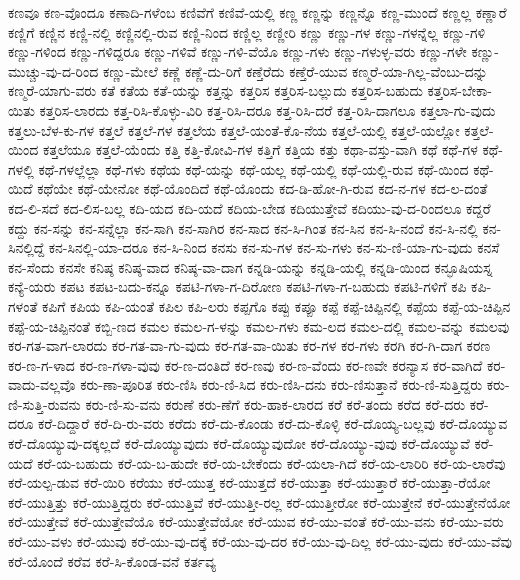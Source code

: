 {ಕಣವೂ
ಕಣ-ವೊಂದೂ
ಕಣಾದಿ-ಗಳೆಂಬ
ಕಣಿವೆಗೆ
ಕಣಿವೆ-ಯಲ್ಲಿ
ಕಣ್ಣ
ಕಣ್ಣನ್ನು
ಕಣ್ಣನ್ನೊ
ಕಣ್ಣ-ಮುಂದೆ
ಕಣ್ಣಲ್ಲ
ಕಣ್ಣಾರೆ
ಕಣ್ಣಿಗೆ
ಕಣ್ಣಿನ
ಕಣ್ಣಿ-ನಲ್ಲಿ
ಕಣ್ಣಿನಲ್ಲಿ-ರುವ
ಕಣ್ಣಿ-ನಿಂದ
ಕಣ್ಣಿಲ್ಲ
ಕಣ್ಣೀರಿ
ಕಣ್ಣು
ಕಣ್ಣು-ಗಳ
ಕಣ್ಣು-ಗಳನ್ನೆಲ್ಲ
ಕಣ್ಣು-ಗಳಿ
ಕಣ್ಣು-ಗಳಿಂದ
ಕಣ್ಣು-ಗಳಿದ್ದರೂ
ಕಣ್ಣು-ಗಳಿವೆ
ಕಣ್ಣು-ಗಳಿ-ವೆಯೊ
ಕಣ್ಣು-ಗಳು
ಕಣ್ಣು-ಗಳುಳ್ಳ-ವರು
ಕಣ್ಣು-ಗಳೇ
ಕಣ್ಣು-ಮುಚ್ಚು-ವು-ದ-ರಿಂದ
ಕಣ್ಣು-ಮೇಲೆ
ಕಣ್ಣೆ
ಕಣ್ಣೆ-ದು-ರಿಗೆ
ಕಣ್ತೆರೆದು
ಕಣ್ತೆರೆ-ಯುವ
ಕಣ್ಮರೆ-ಯಾ-ಗಿಲ್ಲ-ವೆಂಬು-ದನ್ನು
ಕಣ್ಮರೆ-ಯಾಗು-ವರು
ಕತೆ
ಕತೆಯ
ಕತೆ-ಯನ್ನು
ಕತ್ತನ್ನು
ಕತ್ತರಿಸ
ಕತ್ತರಿಸ-ಬಲ್ಲುದು
ಕತ್ತರಿಸ-ಬಹುದು
ಕತ್ತರಿಸ-ಬೇಕಾ-ಯಿತು
ಕತ್ತರಿಸ-ಲಾರದು
ಕತ್ತ-ರಿಸಿ-ಕೊಳ್ಳು-ವಿರಿ
ಕತ್ತ-ರಿಸಿ-ದರೂ
ಕತ್ತ-ರಿಸಿ-ದರೆ
ಕತ್ತ-ರಿಸಿ-ದಾಗಲೂ
ಕತ್ತಲಾ-ಗು-ವುದು
ಕತ್ತಲು-ಬೆಳ-ಕು-ಗಳ
ಕತ್ತಲೆ
ಕತ್ತಲೆ-ಗಳ
ಕತ್ತಲೆಯ
ಕತ್ತಲೆ-ಯಂತೆ-ಕೊ-ನೆಯ
ಕತ್ತಲೆ-ಯಲ್ಲಿ
ಕತ್ತಲೆ-ಯಲ್ಲೋ
ಕತ್ತಲೆ-ಯಿಂದ
ಕತ್ತಲೆಯೂ
ಕತ್ತಲೆ-ಯೆಂದು
ಕತ್ತಿ
ಕತ್ತಿ-ಕೋವಿ-ಗಳ
ಕತ್ತಿಗೆ
ಕತ್ತಿಯ
ಕತ್ತು
ಕಥಾ-ವಸ್ತು-ವಾಗಿ
ಕಥೆ
ಕಥೆ-ಗಳ
ಕಥೆ-ಗಳಲ್ಲಿ
ಕಥೆ-ಗಳಲ್ಲೆಲ್ಲಾ
ಕಥೆ-ಗಳು
ಕಥೆಯ
ಕಥೆ-ಯನ್ನು
ಕಥೆ-ಯಲ್ಲ
ಕಥೆ-ಯಲ್ಲಿ
ಕಥೆ-ಯಲ್ಲಿ-ರುವ
ಕಥೆ-ಯಿಂದ
ಕಥೆ-ಯಿದೆ
ಕಥೆಯೇ
ಕಥೆ-ಯೇನೋ
ಕಥೆ-ಯೊಂದಿದೆ
ಕಥೆ-ಯೊಂದು
ಕದ-ಡಿ-ಹೋ-ಗಿ-ರುವ
ಕದ-ನ-ಗಳ
ಕದ-ಲ-ದಂತೆ
ಕದ-ಲಿ-ಸದೆ
ಕದ-ಲಿಸ-ಬಲ್ಲ
ಕದಿ-ಯದ
ಕದಿ-ಯದೆ
ಕದಿಯ-ಬೇಡ
ಕದಿಯುತ್ತೇವೆ
ಕದಿಯು-ವು-ದ-ರಿಂದಲೂ
ಕದ್ದರೆ
ಕದ್ದು
ಕನ-ಸನ್ನು
ಕನ-ಸನ್ನೆಲ್ಲಾ
ಕನ-ಸಾಗಿ
ಕನ-ಸಾಗಿರ
ಕನ-ಸಾದ
ಕನ-ಸಿ-ಗಿಂತ
ಕನ-ಸಿನ
ಕನ-ಸಿ-ನಂದೆ
ಕನ-ಸಿ-ನಲ್ಲಿ
ಕನ-ಸಿನಲ್ಲಿದ್ದೆ
ಕನ-ಸಿನಲ್ಲಿ-ಯಾ-ದರೂ
ಕನ-ಸಿ-ನಿಂದ
ಕನಸು
ಕನ-ಸು-ಗಳ
ಕನ-ಸು-ಗಳು
ಕನ-ಸು-ಣಿ-ಯಾ-ಗು-ವುದು
ಕನಸೆ
ಕನ-ಸೆಂದು
ಕನಸೇ
ಕನಿಷ್ಠ
ಕನಿಷ್ಠ-ವಾದ
ಕನಿಷ್ಠ-ವಾ-ದಾಗ
ಕನ್ನಡಿ-ಯನ್ನು
ಕನ್ನಡಿ-ಯಲ್ಲಿ
ಕನ್ನಡಿ-ಯಿಂದ
ಕನ್ಫೂಷಿಯಸ್ನ
ಕನ್ಯೆ-ಯರು
ಕಪಟ
ಕಪಟ-ಬದು-ಕನ್ನೂ
ಕಪಟಿ-ಗಳಾ-ಗ-ದಿರೋಣ
ಕಪಟಿ-ಗಳಾ-ಗ-ಬಹುದು
ಕಪಟಿ-ಗಳಿಗೆ
ಕಪಿ
ಕಪಿ-ಗಳಂತೆ
ಕಪಿಗೆ
ಕಪಿಯ
ಕಪಿ-ಯಂತೆ
ಕಪಿಲ
ಕಪಿ-ಲರು
ಕಪ್ಪಗೊ
ಕಪ್ಪು
ಕಪ್ಪೂ
ಕಪ್ಪೆ
ಕಪ್ಪೆ-ಚಿಪ್ಪಿನಲ್ಲಿ
ಕಪ್ಪೆಯ
ಕಪ್ಪೆ-ಯ-ಚಿಪ್ಪಿನ
ಕಪ್ಪೆ-ಯ-ಚಿಪ್ಪಿನಂತೆ
ಕಬ್ಬಿ-ಣದ
ಕಮಲ
ಕಮಲ-ಗ-ಳನ್ನು
ಕಮಲ-ಗಳು
ಕಮ-ಲದ
ಕಮಲ-ದಲ್ಲಿ
ಕಮಲ-ವನ್ನು
ಕಮಲವು
ಕರ-ಗತ-ವಾಗ-ಲಾರದು
ಕರ-ಗತ-ವಾ-ಗು-ವುದು
ಕರ-ಗತ-ವಾ-ಯಿತು
ಕರ-ಗಳ
ಕರ-ಗಳು
ಕರಗಿ
ಕರ-ಗಿ-ದಾಗ
ಕರಣ
ಕರ-ಣ-ಗ-ಳಾದ
ಕರ-ಣ-ಗಳಾ-ವುವು
ಕರ-ಣ-ದಂತಿದೆ
ಕರ-ಣವು
ಕರ-ಣ-ವೆಂದು
ಕರ-ಣವೇ
ಕರನ್ಯಾಸ
ಕರ-ವಾಗಿದೆ
ಕರ-ವಾದು-ವಲ್ಲವೊ
ಕರು-ಣಾ-ಪೂರಿತ
ಕರು-ಣಿಸಿ
ಕರು-ಣಿ-ಸಿದ
ಕರು-ಣಿಸಿ-ದನು
ಕರು-ಣಿಸುತ್ತಾನೆ
ಕರು-ಣಿ-ಸುತ್ತಿದ್ದರು
ಕರು-ಣಿ-ಸುತ್ತಿ-ರುವನು
ಕರು-ಣಿ-ಸು-ವನು
ಕರುಣೆ
ಕರು-ಣೆಗೆ
ಕರು-ಹಾಕ-ಲಾರದ
ಕರೆ
ಕರೆ-ತಂದು
ಕರೆದ
ಕರೆ-ದರು
ಕರೆ-ದರೂ
ಕರೆ-ದಿದ್ದಾರೆ
ಕರೆ-ದಿ-ರು-ವರು
ಕರೆದು
ಕರೆ-ದು-ಕೊಂಡು
ಕರೆ-ದು-ಕೊಳ್ಳಿ
ಕರೆ-ದೊಯ್ಯ-ಬಲ್ಲವು
ಕರೆ-ದೊಯ್ಯುವ
ಕರೆ-ದೊಯ್ಯುವು-ದಕ್ಕಲ್ಲದೆ
ಕರೆ-ದೊಯ್ಯುವುದು
ಕರೆ-ದೊಯ್ಯುವುದೋ
ಕರೆ-ದೊಯ್ಯು-ವುವು
ಕರೆ-ದೊಯ್ಯುವೆ
ಕರೆ-ಯದೆ
ಕರೆ-ಯ-ಬಹುದು
ಕರೆ-ಯ-ಬ-ಹುದೇ
ಕರೆ-ಯ-ಬೇಕೆಂದು
ಕರೆ-ಯಲಾ-ಗಿದೆ
ಕರೆ-ಯ-ಲಾರಿರಿ
ಕರೆ-ಯ-ಲಾರೆವು
ಕರೆ-ಯಲ್ಪ-ಡುವ
ಕರೆ-ಯಿರಿ
ಕರೆಯು
ಕರೆ-ಯುತ್ತ
ಕರೆ-ಯುತ್ತದೆ
ಕರೆ-ಯುತ್ತಾ
ಕರೆ-ಯುತ್ತಾರೆ
ಕರೆ-ಯುತ್ತಾ-ರೆಯೋ
ಕರೆ-ಯುತ್ತಿತ್ತು
ಕರೆ-ಯುತ್ತಿದ್ದರು
ಕರೆ-ಯುತ್ತಿವೆ
ಕರೆ-ಯುತ್ತೀ-ರಲ್ಲ
ಕರೆ-ಯುತ್ತೀರೋ
ಕರೆ-ಯುತ್ತೇನೆ
ಕರೆ-ಯುತ್ತೇನೆಯೋ
ಕರೆ-ಯುತ್ತೇವೆ
ಕರೆ-ಯುತ್ತೇವೆಯೊ
ಕರೆ-ಯುತ್ತೇವೆಯೋ
ಕರೆ-ಯುವ
ಕರೆ-ಯು-ವಂತೆ
ಕರೆ-ಯು-ವನು
ಕರೆ-ಯು-ವರು
ಕರೆ-ಯು-ವಳು
ಕರೆ-ಯುವು
ಕರೆ-ಯು-ವು-ದಕ್ಕೆ
ಕರೆ-ಯು-ವು-ದರ
ಕರೆ-ಯು-ವು-ದಿಲ್ಲ
ಕರೆ-ಯು-ವುದು
ಕರೆ-ಯು-ವೆವು
ಕರೆ-ಯೊಂದೆ
ಕರೆವ
ಕರೆ-ಸಿ-ಕೊಂಡ-ವನೆ
ಕರ್ತವ್ಯ
}

